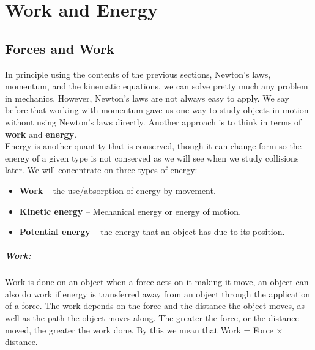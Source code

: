 \documentclass[a4paper,12pt]{book}
\begin{document}

\chapter{Work and Energy}
\label{sec: work and energy}

\section{Forces and Work}
In principle using the contents of the previous sections, Newton's laws, momentum, and the kinematic equations, we can solve pretty much any problem in mechanics. However, Newton's laws are not always easy to apply. We say before that working with momentum gave us one way to study objects in motion without using Newton's laws directly. Another approach is to think in terms of \textbf{work} and \textbf{energy}.\\

Energy is another quantity that is conserved, though it can change form so the energy of a given type is not conserved as we will see when we study collisions later. We will concentrate on three types of energy:
\begin{itemize}
\setlength{\itemsep}{-5pt}
    \item \textbf{Work} -- the use/absorption of energy by movement.
    \item \textbf{Kinetic energy} -- Mechanical energy or energy of motion.
    \item \textbf{Potential energy} -- the energy that an object has due to its position.
\end{itemize} 

\paragraph{Work:} Work is done on an object when a force acts on it making it move, an object can also do work if energy is transferred away from an object through the application of a force. The work depends on the force and the distance the object moves, as well as the path the object moves along. The greater the force, or the distance moved, the greater the work done. By this we mean that Work = Force $\times$ distance. \\
\end{document}

